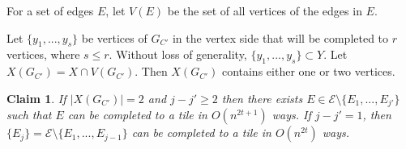 \documentclass{article}
\newtheorem{claim}[theorem]{Claim}
\theoremstyle{definition}
\begin{document}
For a set of edges $E$, let $V(E)$ be the set of all vertices of the edges in $E$.


Let $\{y_1,...,y_s\}$ be vertices of $G_{C'}$ in the vertex side that will  be completed to $r$ vertices,  where $s\leq r$. Without loss of generality, $\{y_1,...,y_s\} \subset Y$. Let $X(G_{C'}) = X\cap V(G_{C'})$. Then $X(G_{C'})$ contains either one or two vertices. 

\begin{claim}\label{lemma:first} If $|X(G_{C'})|=2$ and $j-j'\geq 2$ then there exists  $E\in \mathcal{E}\setminus \{E_1,...,E_{j'}\}$ such that $E$ can be completed to a tile in $O(n^{2t+1})$ ways. If $j-j'=1$, then $\{E_j\} = \mathcal{E}\setminus \{E_1,...,E_{j-1}\}$ can be completed to a tile in $O(n^{2t})$ ways.  
\end{claim}
\end{document}
